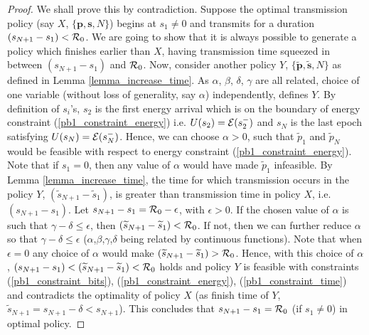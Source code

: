 \begin{proof}
We shall prove this by contradiction. Suppose the optimal transmission policy (say $X$, $\{\bm{p},\bm{s},N\}$) begins at $s_1\neq 0$ and transmits for a duration $(s_{N+1}-s_1)< \mathcal{R}_0$. We are going to show that it is always possible to generate a policy which finishes earlier than $X$, having transmission time squeezed in between $(s_{N+1}-s_1)$ and $\mathcal{R}_0$. Now, consider another policy $Y$, $\{\bm{\widetilde{p}},\bm{\widetilde{s}},N\}$ as defined in Lemma \ref{lemma_increase_time}. As $\alpha$, $\beta$, $\delta$, $\gamma$ are all related, choice of one variable (without loss of generality, say $\alpha$) independently, defines $Y$. By definition of $s_i$'s, $s_{2}$ is the first energy arrival which is on the boundary of energy constraint (\ref{pb1_constraint_energy}) i.e. $U(s_2)=\mathcal{E}(s_2^-)$ and $s_{N}$ is the last epoch satisfying $U(s_N)=\mathcal{E}(s_N^-)$. Hence, we can choose $\alpha>0$, such that $\tilde{p}_1$ and $\tilde{p}_N$ would be feasible with respect to energy constraint (\ref{pb1_constraint_energy}). Note that if $s_1=0$, then any value of $\alpha$ would have made $\widetilde{p}_1$ infeasible. By Lemma \ref{lemma_increase_time}, the time for which transmission occurs in the policy $Y$, $\left( \widetilde{s}_{N+1}-\widetilde{s}_1\right)$, is greater than transmission time in policy $X$, i.e. $(s_{N+1}-s_1)$. Let $s_{N+1}-s_1=\mathcal{R}_0-\epsilon$, with $\epsilon >0$. If the chosen value of $\alpha$ is such that $\gamma -\delta\le\epsilon$, then $\left( \widetilde{s}_{N+1}-\widetilde{s}_1\right)<\mathcal{R}_0$. If not, then we can further reduce $\alpha$ so that $\gamma -\delta\le\epsilon$ ($\alpha$,$\beta$,$\gamma$,$\delta$ being related by continuous functions).  Note that when $\epsilon=0$ any choice of $\alpha$ would make $\left( \widetilde{s}_{N+1}-\widetilde{s}_1\right)>\mathcal{R}_0$. Hence, with this choice of $\alpha$, $(s_{N+1}-s_1)<\left( \widetilde{s}_{N+1}-\widetilde{s}_1\right)<\mathcal{R}_0$ holds and  policy $Y$ is feasible with constraints  (\ref{pb1_constraint_bits}), (\ref{pb1_constraint_energy}), (\ref{pb1_constraint_time}) and contradicts the optimality of policy $X$ (as finish time of $Y$, $\widetilde{s}_{N+1}=s_{N+1}-\delta <s_{N+1}$). This concludes that $s_{N+1}-s_1=\mathcal{R}_0$ (if $s_1\neq 0$) in optimal policy.
\end{proof}